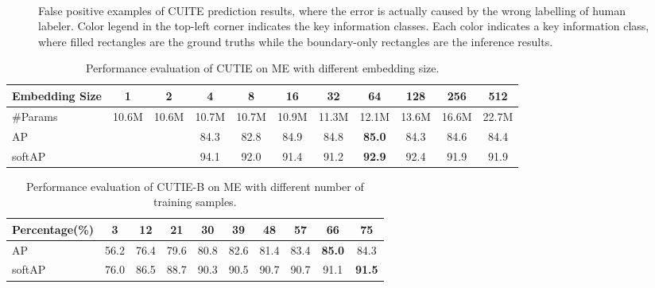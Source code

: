 \documentclass[10pt,twocolumn,letterpaper]{article}
\begin{document}
\begin{figure}
\begin{center}
\\
\end{center}
   \caption{False positive examples of CUITE prediction results, where the error is actually caused by the wrong labelling of human labeler. Color legend in the top-left corner indicates the key information classes. Each color indicates a key information class, where filled rectangles are the ground truths while the boundary-only rectangles are the inference results.}
\label{fig:falselabel}
\end{figure}

\begin{table}
	\caption{Performance evaluation of CUTIE on ME with different embedding size.}
\begin{center}
\begin{tabular}{l | c | c | c | c | c | c | c | c | c | c}
	Embedding Size & 1 & 2 & 4 & 8 & 16 & 32 & 64 & 128 & 256 & 512 \\
	\hline
	\#Params & 10.6M & 10.6M & 10.7M & 10.7M & 10.9M & 11.3M & 12.1M & 13.6M & 16.6M & 22.7M \\
	AP & & & 84.3 & 82.8 & 84.9 & 84.8 & \textbf{85.0} & 84.3 & 84.6 & 84.4 \\
	softAP & & & 94.1 & 92.0 & 91.4 & 91.2 & \textbf{92.9} & 92.4 & 91.9 & 91.9 \\
\end{tabular}
\end{center}
	\label{tab:embedding}
\end{table}

\begin{table}
	\caption{Performance evaluation of CUTIE-B on ME with different number of training samples.}
\begin{center}
\begin{tabular}{l | c | c | c | c | c | c | c | c | c}
	Percentage(\%) & 3 & 12 & 21 & 30 & 39 & 48 & 57 & 66 & 75 \\
	\hline
	AP & 56.2 & 76.4 & 79.6 & 80.8 & 82.6 & 81.4 & 83.4 & \textbf{85.0} & 84.3 \\
	softAP & 76.0 & 86.5 & 88.7 & 90.3 & 90.5 & 90.7 & 90.7 & 91.1 & \textbf{91.5} \\
\end{tabular}
\end{center}
	\label{tab:samples}
\end{table}
\end{document}
